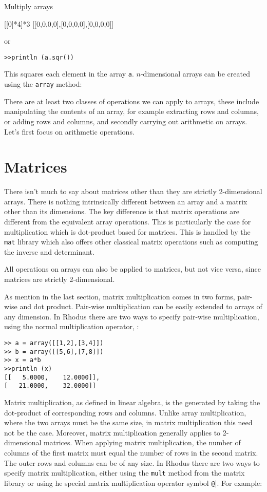 Multiply arrays

[[0]*4]*3
[[0,0,0,0],[0,0,0,0],[0,0,0,0]]

or

\begin{lstlisting}
>>println (a.sqr())
\end{lstlisting}

This squares each element in the array {\tt a}. $n$-dimensional arrays can be created using the {\tt array} method:


There are at least two classes of operations we can apply to arrays, these include manipulating the contents of an array, for example extracting rows and columns, or adding rows and columns, and secondly carrying out arithmetic on arrays. Let's first focus on arithmetic operations.

\section{Matrices}

There isn't much to say about matrices other than they are strictly 2-dimensional arrays. There is nothing intrinsically different between an array and a matrix other than its dimensions. The key difference is that matrix operations are different from the equivalent array operations. This is particularly the case for multiplication which is dot-product based for matrices. This is handled by the {\tt mat} library which also offers other classical matrix operations such as computing the inverse and determinant.

All operations on arrays can also be applied to matrices, but not vice versa, since matrices are strictly 2-dimensional.

As mention in the last section, matrix multiplication comes in two forms, pair-wise and dot product. Pair-wise multiplication can be easily extended to arrays of any dimension. In Rhodus there are two ways to specify pair-wise multiplication, using the normal multiplication operator, {\tt *}:

\begin{lstlisting}
>> a = array([[1,2],[3,4]])
>> b = array([[5,6],[7,8]])
>> x = a*b
>>println (x)
[[   5.0000,    12.0000]],
[   21.0000,    32.0000]]
\end{lstlisting}

Matrix multiplication, as defined in linear algebra, is the generated by taking the dot-product of corresponding rows and columns.  Unlike array multiplication, where the two arrays must be the same size, in matrix multiplication this need not be the case. Moreover, matrix multiplication generally applies to 2-dimensional matrices. When applying matrix multiplication, the number of columns of the first matrix must equal the number of rows in the second matrix. The outer rows and columns can be of any size. In Rhodus there are two ways to specify matrix multiplication, either using the {\tt mult} method from the matrix library or using he special matrix multiplication operator symbol {\tt @}|. For example:

